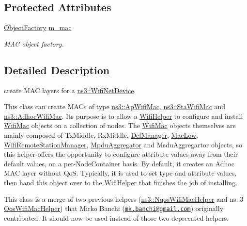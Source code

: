 \subsection*{Protected Attributes}
\begin{DoxyCompactItemize}
\item 
\hyperlink{classns3_1_1ObjectFactory}{Object\+Factory} \hyperlink{classns3_1_1WifiMacHelper_a1c226e6af5625ee850dbf723e3c6ea2e}{m\+\_\+mac}
\begin{DoxyCompactList}\small\item\em M\+AC object factory. \end{DoxyCompactList}\end{DoxyCompactItemize}


\subsection{Detailed Description}
create M\+AC layers for a \hyperlink{classns3_1_1WifiNetDevice}{ns3\+::\+Wifi\+Net\+Device}. 

This class can create M\+A\+Cs of type \hyperlink{classns3_1_1ApWifiMac}{ns3\+::\+Ap\+Wifi\+Mac}, \hyperlink{classns3_1_1StaWifiMac}{ns3\+::\+Sta\+Wifi\+Mac} and \hyperlink{classns3_1_1AdhocWifiMac}{ns3\+::\+Adhoc\+Wifi\+Mac}. Its purpose is to allow a \hyperlink{classns3_1_1WifiHelper}{Wifi\+Helper} to configure and install \hyperlink{classns3_1_1WifiMac}{Wifi\+Mac} objects on a collection of nodes. The \hyperlink{classns3_1_1WifiMac}{Wifi\+Mac} objects themselves are mainly composed of Tx\+Middle, Rx\+Middle, \hyperlink{classns3_1_1DcfManager}{Dcf\+Manager}, \hyperlink{classns3_1_1MacLow}{Mac\+Low}, \hyperlink{classns3_1_1WifiRemoteStationManager}{Wifi\+Remote\+Station\+Manager}, \hyperlink{classns3_1_1MpduAggregator}{Mpdu\+Aggregator} and Msdu\+Aggregartor objects, so this helper offers the opportunity to configure attribute values away from their default values, on a per-\/\+Node\+Container basis. By default, it creates an Adhoc M\+AC layer without QoS. Typically, it is used to set type and attribute values, then hand this object over to the \hyperlink{classns3_1_1WifiHelper}{Wifi\+Helper} that finishes the job of installing.

This class is a merge of two previous helpers (\hyperlink{classns3_1_1NqosWifiMacHelper}{ns3\+::\+Nqos\+Wifi\+Mac\+Helper} and ns\+:\+:3 \hyperlink{classns3_1_1QosWifiMacHelper}{Qos\+Wifi\+Mac\+Helper}) that Mirko Banchi (\href{mailto:mk.banchi@gmail.com}{\tt mk.\+banchi@gmail.\+com}) originally contributed. It should now be used instead of those two deprecated helpers.

